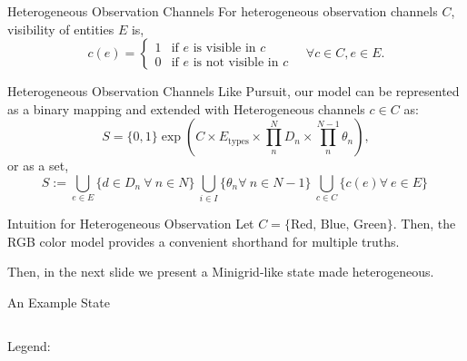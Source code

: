 \begin{frame}{Heterogeneous Observation Channels}
    For heterogeneous observation channels \(C\),
    visibility of entities \(E\) is,
    \[
        c(e) = 
        \begin{cases}
            1& \text{if \(e\) is visible in \(c\)} \\ 
            0& \text{if \(e\) is not visible in \(c\)}
        \end{cases} 
        \quad\forall c\in C, e\in E.
    \]
\end{frame}

\begin{frame}{Heterogeneous Observation Channels}
    Like Pursuit, our model can be represented as a binary mapping
    and extended with Heterogeneous channels \(c\in C\) as:
    \[
        S = \{0,1\}\exp\left(C\times E_\text{types}
        \times \prod_{n}^{N} D_n \times \prod_{n}^{N-1} \theta_n\right),
    \]
    or as a set,
    \[
        S := \bigcup_{e \in E} \{d\in D_n\ \forall\ n\in N\}\
        \bigcup_{i \in I} \{\theta_{n} \forall\ n\in N-1\}\
        \bigcup_{c\in C} \{c(e) \forall\ e\in E\}\
    \]
\end{frame}

\begin{frame}{Intuition for Heterogeneous Observation}
    Let \(C = \{\text{Red, Blue, Green}\}\).
    Then, the RGB color model 
    provides a convenient shorthand for multiple truths. \\
   \begin{figure}
        \centering
        
    \end{figure}
    Then, in the next slide we present a Minigrid-like state made heterogeneous.
\end{frame}

\begin{frame}{An Example State}
    \begin{columns}
        \begin{column}{0.4\linewidth}
            Legend:
            \begin{figure}
                \resizebox{!}{0.5\linewidth}{%
                    
                }
            \end{figure}
        \end{column}
        \begin{column}{0.6\linewidth}
            \begin{figure}
                \resizebox{\linewidth}{!}{%
                    
                }
            \end{figure}
        \end{column}
    \end{columns}
\end{frame}

